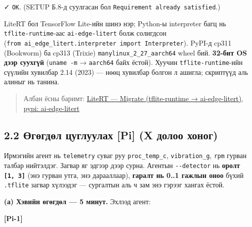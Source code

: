 ✓ \texttt{OK}. (SETUP Б.8-д суулгасан бол \texttt{Requirement\ already\ satisfied}.)

LiteRT бол TensorFlow Lite-ийн шинэ нэр; Python-ы interpreter багц нь \texttt{tflite-runtime}-аас \texttt{ai-edge-litert} болж солигдсон (\texttt{from\ ai\_\allowbreak{}edge\_\allowbreak{}litert.\allowbreak{}interpreter\ import\ Interpreter}). PyPI-д cp311 (Bookworm) ба cp313 (Trixie) \texttt{manylinux\_\allowbreak{}2\_\allowbreak{}27\_\allowbreak{}aarch64} wheel бий. \textbf{32-бит OS дээр суухгүй} (\texttt{uname\ -m} → \texttt{aarch64} байх ёстой). Хуучин \texttt{tflite-runtime}-ийн сүүлийн хувилбар 2.14 (2023) --- нөөц хувилбар болгон л ашигла; скриптүүд аль алиныг нь танина.

\begin{quote}
Албан ёсны баримт: \href{https://ai.google.dev/edge/litert/migration}{LiteRT --- Migrate (tflite-runtime → ai-edge-litert)}, \href{https://pypi.org/project/ai-edge-litert/}{pypi: ai-edge-litert}
\end{quote}

\hypertarget{ux4e9ux433ux4e9ux433ux434ux4e9ux43b-ux446ux443ux433ux43bux443ux443ux43bux430ux445-pi-x-ux434ux43eux43bux43eux43e-ux445ux43eux43dux43eux433}{%
\subsection{2.2 Өгөгдөл цуглуулах {[}Pi{]} (X долоо хоног)}\label{ux4e9ux433ux4e9ux433ux434ux4e9ux43b-ux446ux443ux433ux43bux443ux443ux43bux430ux445-pi-x-ux434ux43eux43bux43eux43e-ux445ux43eux43dux43eux433}}

Ирмэгийн агент нь \texttt{telemetry} суваг руу \texttt{proc\_\allowbreak{}temp\_\allowbreak{}c}, \texttt{vibration\_g}, \texttt{rpm} гурван талбар нийтэлдэг. Загвар яг эдгээр дээр сурна. Агентын \texttt{-\/-detector} нь \textbf{оролт \texttt{{[}1,\ 3{]}}} (энэ гурван утга, энэ дарааллаар), \textbf{гаралт нь 0..1 гажлын оноо} бүхий \texttt{.tflite} загвар хүлээдэг --- сургалтын аль ч зам энэ гэрээг хангах ёстой.

\textbf{(а) Хэвийн өгөгдөл --- 5 минут.} Эхлээд агент:

\textbf{{[}Pi-1{]}}

\begin{Shaded}
\begin{Highlighting}[]
\KeywordTok{\&\&}  \StringTok{\textquotesingle{}\textquotesingle{}}
\end{Highlighting}
\end{Shaded}

